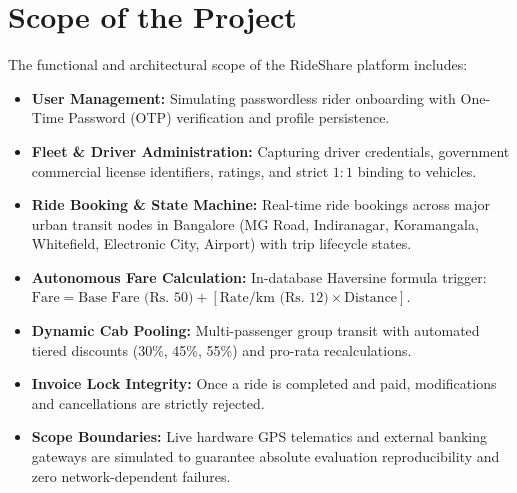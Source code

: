 \section{Scope of the Project}
The functional and architectural scope of the RideShare platform includes:
\begin{itemize}[itemsep=1.5pt, topsep=2pt, parsep=0pt]
    \item \textbf{User Management:} Simulating passwordless rider onboarding with One-Time Password (OTP) verification and profile persistence.
    \item \textbf{Fleet \& Driver Administration:} Capturing driver credentials, government commercial license identifiers, ratings, and strict $1:1$ binding to vehicles.
    \item \textbf{Ride Booking \& State Machine:} Real-time ride bookings across major urban transit nodes in Bangalore (MG Road, Indiranagar, Koramangala, Whitefield, Electronic City, Airport) with trip lifecycle states.
    \item \textbf{Autonomous Fare Calculation:} In-database Haversine formula trigger: $\text{Fare} = \text{Base Fare (Rs. 50)} + [\text{Rate/km (Rs. 12)} \times \text{Distance}]$.
    \item \textbf{Dynamic Cab Pooling:} Multi-passenger group transit with automated tiered discounts (30\%, 45\%, 55\%) and pro-rata recalculations.
    \item \textbf{Invoice Lock Integrity:} Once a ride is completed and paid, modifications and cancellations are strictly rejected.
    \item \textbf{Scope Boundaries:} Live hardware GPS telematics and external banking gateways are simulated to guarantee absolute evaluation reproducibility and zero network-dependent failures.
\end{itemize}
